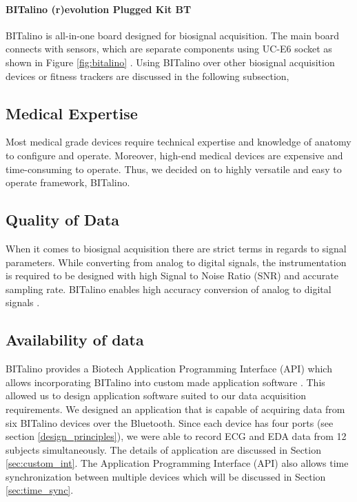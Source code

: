 \paragraph{BITalino (r)evolution Plugged Kit BT} BITalino is all-in-one board designed for biosignal acquisition. The main board connects with sensors, which are separate components using UC-E6 socket as shown in Figure \ref{fig:bitalino} \cite{bitalino_datasheet}. Using BITalino over other biosignal acquisition devices or fitness trackers are discussed in the following subsection,

\subsection{Medical Expertise} Most medical grade devices require technical expertise and knowledge of anatomy to configure and operate. Moreover, high-end medical devices are expensive and time-consuming to operate. Thus, we decided on to highly versatile and easy to operate framework, BITalino.

\subsection{Quality of Data} When it comes to biosignal acquisition there are strict terms in regards to signal parameters. While converting from analog to digital signals, the instrumentation is required to be designed with high Signal to Noise Ratio (SNR) and accurate sampling rate. BITalino enables high accuracy conversion of analog to digital signals \cite{guerreiro_performance_2014}.

\subsection{Availability of data} BITalino provides a Biotech Application Programming Interface (API) which allows incorporating BITalino into custom made application software \cite{noauthor_biotech_nodate}. This allowed us to design application software suited to our data acquisition requirements. We designed an application that is capable of acquiring data from six BITalino devices over the Bluetooth. Since each device has four ports (see section \ref{design_principles}), we were able to record ECG and EDA data from 12 subjects simultaneously. The details of application are discussed in Section \ref{sec:custom_int}. The Application Programming Interface (API) also allows time synchronization between multiple devices which will be discussed in Section \ref{sec:time_sync}.

